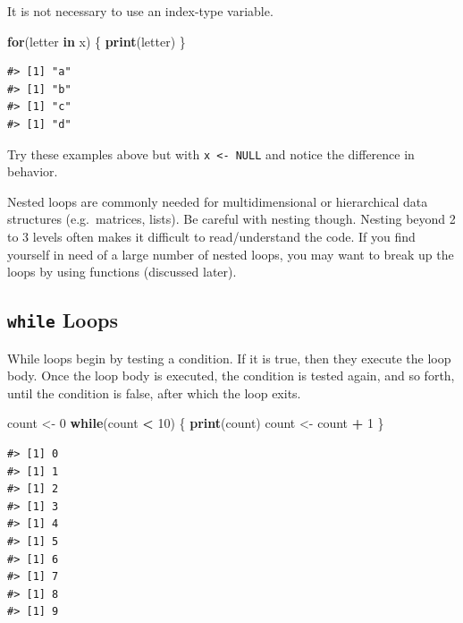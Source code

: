 \documentclass[]{book}
\newenvironment{Shaded}{\begin{snugshade}}{\end{snugshade}}
\newcommand{\KeywordTok}[1]{\textcolor[rgb]{0.13,0.29,0.53}{\textbf{#1}}}
\newcommand{\DecValTok}[1]{\textcolor[rgb]{0.00,0.00,0.81}{#1}}
\newcommand{\StringTok}[1]{\textcolor[rgb]{0.31,0.60,0.02}{#1}}
\newcommand{\ControlFlowTok}[1]{\textcolor[rgb]{0.13,0.29,0.53}{\textbf{#1}}}
\newcommand{\OperatorTok}[1]{\textcolor[rgb]{0.81,0.36,0.00}{\textbf{#1}}}
\newcommand{\NormalTok}[1]{#1}
\theoremstyle{definition}
\theoremstyle{definition}
\theoremstyle{definition}
\theoremstyle{remark}
\begin{document}
It is not necessary to use an index-type variable.

\begin{Shaded}
\begin{Highlighting}[]
\ControlFlowTok{for}\NormalTok{(letter }\ControlFlowTok{in}\NormalTok{ x) \{}
        \KeywordTok{print}\NormalTok{(letter)}
\NormalTok{\}}
\end{Highlighting}
\end{Shaded}

\begin{verbatim}
#> [1] "a"
#> [1] "b"
#> [1] "c"
#> [1] "d"
\end{verbatim}

Try these examples above but with \texttt{x\ \textless{}-\ NULL} and
notice the difference in behavior.

Nested loops are commonly needed for multidimensional or hierarchical
data structures (e.g.~matrices, lists). Be careful with nesting though.
Nesting beyond 2 to 3 levels often makes it difficult to read/understand
the code. If you find yourself in need of a large number of nested
loops, you may want to break up the loops by using functions (discussed
later).

\subsection{\texorpdfstring{\texttt{while}
Loops}{while Loops}}\label{while-loops}

While loops begin by testing a condition. If it is true, then they
execute the loop body. Once the loop body is executed, the condition is
tested again, and so forth, until the condition is false, after which
the loop exits.

\begin{Shaded}
\begin{Highlighting}[]
\NormalTok{count <-}\StringTok{ }\DecValTok{0}
\ControlFlowTok{while}\NormalTok{(count }\OperatorTok{<}\StringTok{ }\DecValTok{10}\NormalTok{) \{}
        \KeywordTok{print}\NormalTok{(count)}
\NormalTok{        count <-}\StringTok{ }\NormalTok{count }\OperatorTok{+}\StringTok{ }\DecValTok{1}
\NormalTok{\}}
\end{Highlighting}
\end{Shaded}

\begin{verbatim}
#> [1] 0
#> [1] 1
#> [1] 2
#> [1] 3
#> [1] 4
#> [1] 5
#> [1] 6
#> [1] 7
#> [1] 8
#> [1] 9
\end{verbatim}
\end{document}
